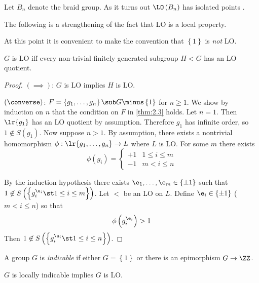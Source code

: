 \begin{exm}
Let $B_n$ denote the braid group.
As it turns out
$\LO\left(B_n\right)$ has isolated points \cite{dubrov}.
\end{exm}

The following is a strengthening of the fact that LO is a local property. 

\begin{wrn}
At this point it is convenient to make the convention that $\left\{1\right\}$ is
\emph{not} LO.
\end{wrn}

\begin{thm}
$G$ is LO iff every non-trivial finitely generated subgroup $H< G$ has an LO quotient.
\label{thm:BH}
\end{thm}

\begin{proof}
$\left(\implies\right)$: $G$ is LO implies $H$ is LO.

$\left(\converse\right)$: $F = \left\{g_1 , \ldots , g_n\right\}\sub G\minus
\left\{1\right\}$ for $n\geq 1$.
We show by induction on $n$ that the condition on $F$ in \cref{thm:2.3} holds.
Let $n = 1$. Then $\lr{g_1}$ has an LO quotient by assumption. 
Therefore $g_1$ has infinite  order, so $1\not\in S\left(g_1\right)$. 
Now suppose $n > 1$. By assumption, there exists a nontrivial homomorphism 
$\phi : \lr{g_1 , \ldots , g_n} \to L$ where $L$ is LO.
For some $m$ there exists
\begin{equation*}
\phi\left(g_i\right) = 
\begin{cases}
+1 & 1 \leq i\leq m \\
-1 & m< i \leq n
\end{cases}
\end{equation*}

By the induction hypothesis there exists $\e_1 , \ldots , \e_m\in \left\{\pm 1\right\}$
such that $1\not \in S\left(\left\{g_i^{\e_i}  \st 1\leq i\leq m\right\}\right)$.
Let $<$ be an LO on $L$. Define  $\e_i \in \left\{\pm 1\right\}$ ($m < i \leq n$) 
so that
\begin{equation}
\phi\left(g_i^{\e_i}\right) > 1
\end{equation}
Then $1\not \in S\left(\left\{g_i^{\e_i} \st 1\leq i\leq n\right\}\right)$.
\end{proof}

A group $G$ is \emph{indicable} if either $G = \left\{1\right\}$ or there is an
epimorphism $G\to \ZZ$.

\begin{cor}
$G$ is locally indicable implies $G$ is LO.
\label{cor:2.12}
\end{cor}

